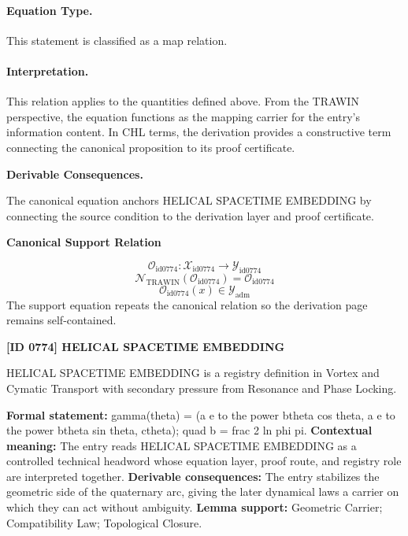 \paragraph{Equation Type.}
This statement is classified as a map relation.

\paragraph{Interpretation.}
This relation applies to the quantities defined above. From the TRAWIN perspective, the equation functions as the mapping carrier for the entry’s information content. In CHL terms, the derivation provides a constructive term connecting the canonical proposition to its proof certificate.

\par\vspace{0.35em}
\noindent\textbf{Derivable Consequences.}\quad
\begingroup
\footnotesize
\raggedright
The canonical equation anchors HELICAL SPACETIME EMBEDDING by connecting the source condition to the derivation layer and proof certificate.
\par\endgroup

\noindent\textbf{Canonical Support Relation}\par
\[
\mathcal{O}_{\mathrm{id0774}}:\mathcal{X}_{\mathrm{id0774}}\longrightarrow\mathcal{Y}_{\mathrm{id0774}}
\]
\[
\mathcal{N}_{\mathrm{TRAWIN}}(\mathcal{O}_{\mathrm{id0774}})=\mathcal{O}_{\mathrm{id0774}}
\]
\[
\mathcal{O}_{\mathrm{id0774}}(x)\in\mathcal{Y}_{\mathrm{adm}}
\]
\noindent The support equation repeats the canonical relation so the derivation page remains self-contained.\par

\clearpage
\noindent\textbf{[ID 0774] HELICAL SPACETIME EMBEDDING}\par
\vspace{0.35em}
\begingroup\small
{}
HELICAL SPACETIME EMBEDDING is a registry definition in Vortex and Cymatic Transport with secondary pressure from Resonance and Phase Locking.

\begingroup\footnotesize\setlength{\emergencystretch}{3em}\sloppy
\textbf{Formal statement:} gamma(theta) = (a e to the power btheta cos theta, a e to the power btheta sin theta, ctheta); quad b = frac 2 ln phi pi. \textbf{Contextual meaning:} The entry reads HELICAL SPACETIME EMBEDDING as a controlled technical headword whose equation layer, proof route, and registry role are interpreted together. \textbf{Derivable consequences:} The entry stabilizes the geometric side of the quaternary arc, giving the later dynamical laws a carrier on which they can act without ambiguity. \textbf{Lemma support:} Geometric Carrier; Compatibility Law; Topological Closure.\par
\endgroup

